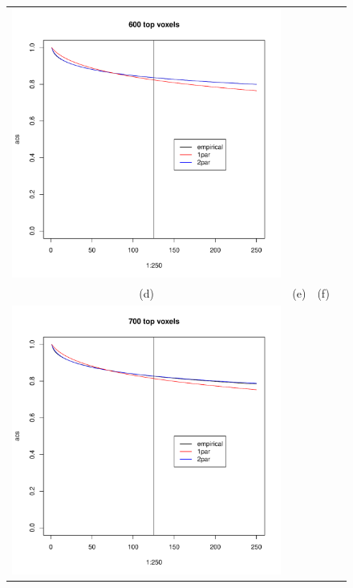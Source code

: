 \documentclass[12pt]{article}
\begin{document}
\begin{figure}
\begin{center}
\begin{tabular}{cccc}
\includegraphics[scale=0.3]{../Yuval/ident_extrap6.pdf} \\
(d) & (e) & (f) \\
\includegraphics[scale=0.3]{../Yuval/ident_extrap7.pdf} &

\end{tabular}
\end{center}
\end{figure}
\end{document}
